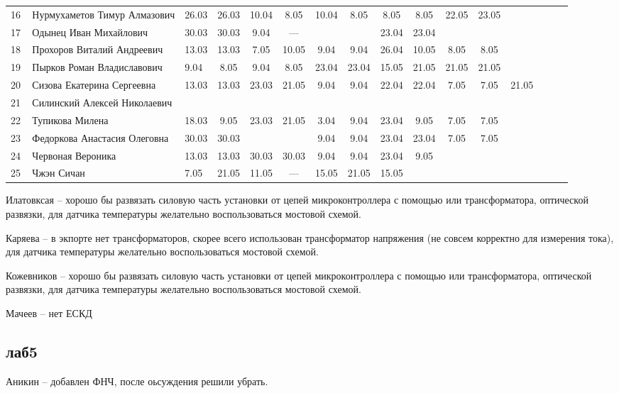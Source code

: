 \documentclass[a4paper,11pt]{article}
\begin{document}
\begin{tabular}{l|llccccccccccccc}
\midrule
16\,&Нурмухаметов Тимур Алмазович   &26.03&26.03 &10.04& 8.05&10.04& 8.05& 8.05& 8.05&22.05&23.05\\
17\,&Одынец Иван Михайлович         &30.03&30.03 & 9.04& --- &     &     &23.04&23.04\\
18\,&Прохоров Виталий Андреевич     &13.03&13.03 & 7.05&10.05& 9.04& 9.04&26.04&10.05& 8.05& 8.05\\
19\,&Пырков Роман Владиславович     & 9.04& 8.05 & 9.04& 8.05&23.04&23.04&15.05&21.05&21.05&21.05\\
20\,&Сизова Екатерина Сергеевна     &13.03&13.03 &23.03&21.05& 9.04& 9.04&22.04&22.04& 7.05& 7.05&21.05&\\
\midrule
21\,&Силинский Алексей Николаевич   &     &      &     &     &     &     &     &\\
22\,&Тупикова Милена                &18.03& 9.05 &23.03&21.05& 3.04& 9.04&23.04& 9.05& 7.05& 7.05\\
23\,&Федоркова Анастасия Олеговна   &30.03&30.03 &     &     & 9.04& 9.04&23.04&23.04& 7.05&7.05\\
24\,&Червоная Вероника              &13.03&13.03 &30.03&30.03& 9.04& 9.04&23.04& 9.05&     &\\
25\,&Чжэн Сичан                     & 7.05&21.05 &11.05& --- &15.05&21.05&15.05&\\
\bottomrule
\end{tabular}

\newpage
{}
\recalctypearea
{}

Илатовксая -- хорошо бы развязать силовую часть установки от цепей микроконтроллера с помощью или трансформатора, оптической развязки, 
для датчика температуры желательно воспользоваться мостовой схемой.

Каряева -- в экпорте нет трансформаторов, скорее всего использован трансформатор напряжения (не совсем корректно для измерения тока), 
для датчика температуры желательно воспользоваться мостовой схемой.

Кожевников -- хорошо бы развязать силовую часть установки от цепей микроконтроллера с помощью или трансформатора, оптической развязки,
для датчика температуры желательно воспользоваться мостовой схемой.

Мачеев -- нет ЕСКД

\subsection*{лаб5}
Аникин -- добавлен ФНЧ, после оьсуждения решили убрать.
\end{document}
